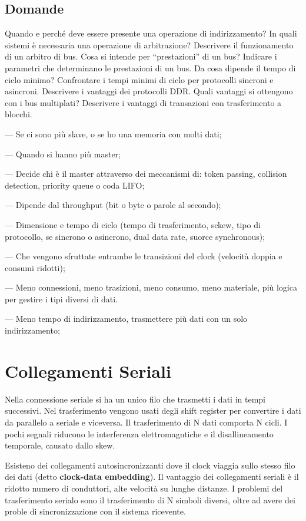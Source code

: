 \documentclass[12pt]{article}
\begin{document}
\subsection{Domande}
Quando e perché deve essere presente una operazione di indirizzamento?
In quali sistemi è necessaria una operazione di arbitrazione?
Descrivere il funzionamento di un arbitro di bus.
Cosa si intende per “prestazioni” di un bus?
Indicare i parametri che determinano le prestazioni di un bus.
Da cosa dipende il tempo di ciclo minimo?
Confrontare i tempi minimi di ciclo per protocolli sincroni e asincroni.
Descrivere i vantaggi dei protocolli DDR.
Quali vantaggi si ottengono con i bus multiplati?
Descrivere i vantaggi di transazioni con trasferimento a blocchi.


--- Se ci sono pi\`u slave, o se ho una memoria con molti dati;

--- Quando si hanno pi\`u master;

--- Decide chi \`e il master attraverso dei meccanismi di: token passing, collision detection, priority queue o coda LIFO;

--- Dipende dal throughput (bit o byte o parole al secondo);

--- Dimensione e tempo di ciclo (tempo di trasferimento, sckew, tipo di protocollo, se sincrono o asincrono, dual data rate, suorce synchronous);

--- Che vengono sfruttate entrambe le transizioni del clock (velocit\`a doppia e consumi ridotti);

--- Meno connessioni, meno trasizioni, meno consumo, meno materiale, pi\`u logica per gestire i tipi diversi di dati.

---  Meno tempo di indirizzamento, trasmettere pi\`u dati con un solo indirizzamento;





\newpage
\section{Collegamenti Seriali}
 Nella connessione seriale si ha un unico filo che trasmetti i dati in tempi successivi. Nel trasferimento vengono usati degli shift register per convertire i dati da parallelo a seriale e viceversa. Il trasferimento di N dati comporta N cicli. I pochi segnali riducono le interferenza elettromagntiche e il disallineamento temporale, causato dallo skew.

 Esisteno dei collegamenti autosincronizzanti dove il clock viaggia sullo stesso filo dei dati (detto \textbf{clock-data embedding}). Il vantaggio dei collegamenti seriali \`e il ridotto numero di conduttori, alte velocit\`a su lunghe distanze.  I problemi del trasferimento serialo sono il trasferimento di N simboli diversi, oltre ad avere dei proble di sincronizzazione con il sistema ricevente.
\end{document}
